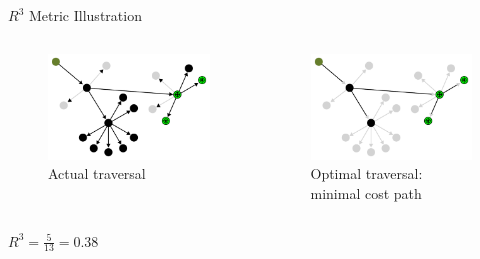 \begin{frame}{$R^{3}$ Metric Illustration}
  \centering
  \begin{columns}[c]
    \begin{figure}
      \includegraphics[width=\linewidth]{images/r3-metric-bad-traversal.pdf}
      \caption{\small Actual traversal}
    \end{figure}

    \begin{figure}
      \includegraphics[width=\linewidth]{images/r3-metric-good-traversal.pdf}
      \caption{\small Optimal traversal: minimal cost path}
    \end{figure}
  \end{columns}

  \vspace{1em}
  \small $ R^{3} = \frac{5}{13} = 0.38$
\end{frame}